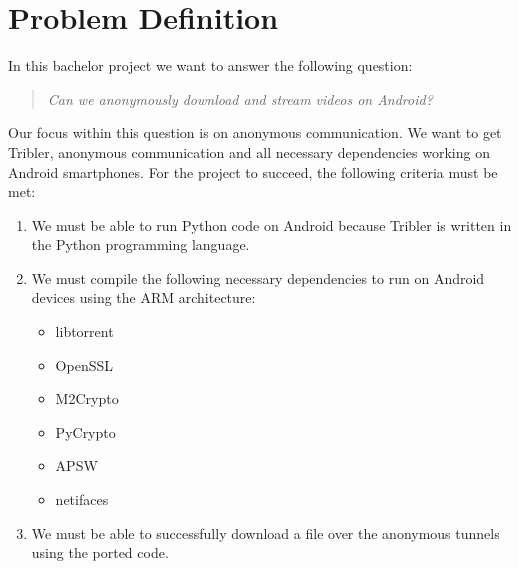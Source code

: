 \chapter{Problem Definition}

In this bachelor project we want to answer the following question:

\begin{quote}
\emph{Can we anonymously download and stream videos on Android?}
\end{quote}

Our focus within this question is on anonymous communication. We want to get Tribler, anonymous communication and all necessary dependencies working on Android smartphones. For the project to succeed, the following criteria must be met:
\begin{enumerate}
\item We must be able to run Python code on Android because Tribler is written in the Python programming language.
\item We must compile the following necessary dependencies to run on Android devices using the ARM architecture:
\begin{itemize}
\item libtorrent
\item OpenSSL
\item M2Crypto
\item PyCrypto
\item APSW
\item netifaces
\end{itemize}
\item We must be able to successfully download a file over the anonymous tunnels using the ported code.
\end{enumerate}

